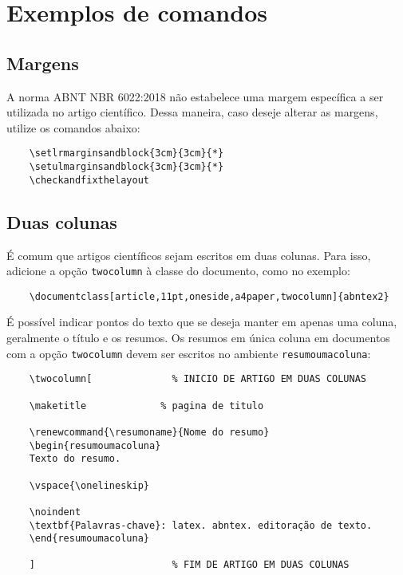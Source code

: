 \documentclass[
article,			%
11pt,				%
oneside,			%
a4paper,			%
english,			%
brazil,				%
sumario=tradicional
]{abntex2}
\begin{document}
	\section{Exemplos de comandos}
	
	\subsection{Margens}
	
	A norma ABNT NBR 6022:2018 não estabelece uma margem específica a ser utilizada
	no artigo científico. Dessa maneira, caso deseje alterar as margens, utilize os
	comandos abaixo:
	
	\begin{verbatim}
	\setlrmarginsandblock{3cm}{3cm}{*}
	\setulmarginsandblock{3cm}{3cm}{*}
	\checkandfixthelayout
	\end{verbatim}
	
	\subsection{Duas colunas}
	
	É comum que artigos científicos sejam escritos em duas colunas. Para isso,
	adicione a opção \texttt{twocolumn} à classe do documento, como no exemplo:
	
	\begin{verbatim}
	\documentclass[article,11pt,oneside,a4paper,twocolumn]{abntex2}
	\end{verbatim}
	
	É possível indicar pontos do texto que se deseja manter em apenas uma coluna,
	geralmente o título e os resumos. Os resumos em única coluna em documentos com
	a opção \texttt{twocolumn} devem ser escritos no ambiente
	\texttt{resumoumacoluna}:
	
	\begin{verbatim}
	\twocolumn[              % INICIO DE ARTIGO EM DUAS COLUNAS
	
	\maketitle             % pagina de titulo
	
	\renewcommand{\resumoname}{Nome do resumo}
	\begin{resumoumacoluna}
	Texto do resumo.
	
	\vspace{\onelineskip}
	
	\noindent
	\textbf{Palavras-chave}: latex. abntex. editoração de texto.
	\end{resumoumacoluna}
	
	]                        % FIM DE ARTIGO EM DUAS COLUNAS
	\end{verbatim}
	
\end{document}
